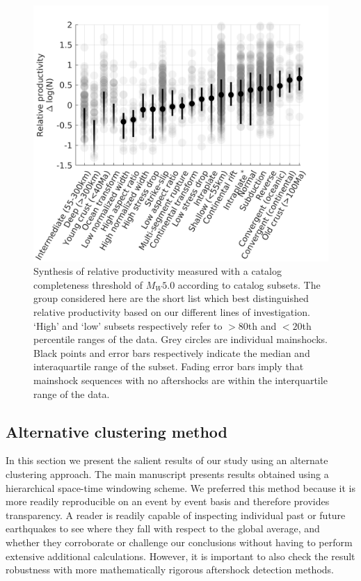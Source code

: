 \documentclass[draft]{agujournal}
\begin{document}
\begin{figure}[H]
\centering

\includegraphics{figures/cal_tech_mw5.png}
\caption{Synthesis of relative productivity measured with a catalog completeness threshold of $M_W5.0$ according to catalog subsets. The group considered here are the short list which best distinguished relative productivity based on our different lines of investigation. `High' and `low' subsets respectively refer to $>\!\!80$th and $<\!\!20$th percentile ranges of the data. Grey circles are individual mainshocks. Black points and error bars respectively indicate the median and interaquartile range of the subset. Fading error bars imply that mainshock sequences with no aftershocks are within the interquartile range of the data.}
\label{fig:caltech}
\end{figure}   

\newpage
\subsection{Alternative clustering method}\label{sec:alt}

In this section we present the salient results of our study using an alternate clustering approach. The main manuscript presents results obtained using a hierarchical space-time windowing scheme. We preferred this method because it is more readily reproducible on an event by event basis and therefore provides  transparency.  A reader is readily capable of inspecting individual past or future earthquakes to see where they fall with respect to the global average, and whether they corroborate or challenge our conclusions without having to perform extensive additional calculations. However, it is important to also check the result robustness with more mathematically rigorous aftershock detection methods.   
\end{document}
